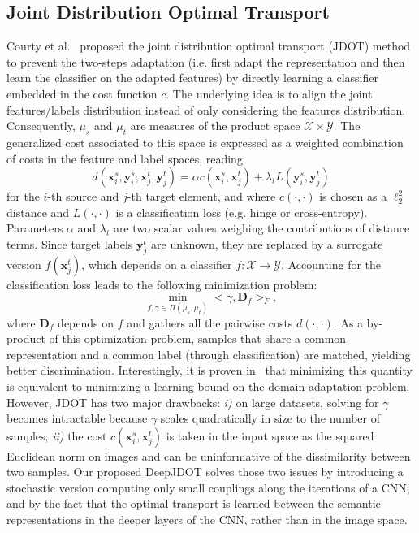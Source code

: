 \documentclass[runningheads]{llncs}
\begin{document}
\subsection{Joint Distribution Optimal Transport}
Courty et al.~\cite{courty2017joint} proposed the joint distribution optimal transport (JDOT) method to prevent the two-steps adaptation (i.e. first adapt the representation and then learn the classifier on the adapted features) by directly learning a classifier embedded in the cost function $c$. The underlying idea is to align the joint features/labels distribution instead of only considering the features distribution. Consequently, $\mu_s$ and $\mu_t$ are measures of the product space $\mathcal{X}\times\mathcal{Y}$. The generalized cost associated to this space is expressed as a weighted combination of costs in the feature and label spaces, reading
 \begin{equation}
d \left( \mathbf{x}_i^s, \mathbf{y}_i^s;\mathbf{x}_j^t, \mathbf{y}_j^t \right) = \alpha c(\mathbf{x}_i^s,\mathbf{x}_j^t) + \lambda_t L(\mathbf{y}_i^s,\mathbf{y}_j^t)
 \label{eq:cost}
 \end{equation}
 for the $i$-th source and $j$-th target element, and where $c(\cdot,\cdot)$ is chosen as a $\ell^2_2$ distance and $L(\cdot,\cdot)$ is a classification loss (e.g. hinge or cross-entropy). Parameters $\alpha$ and $ \lambda_t$ are two scalar values weighing the contributions of distance terms. Since target labels $\mathbf{y}_j^t$ are unknown, they are replaced by a surrogate version $f(\mathbf{x}_j^t)$, which depends on a classifier $f:\mathcal{X}\rightarrow\mathcal{Y}$. Accounting for the classification loss leads to the following minimization problem:
 \begin{equation}
 \min_{f,\gamma \in \Pi(\mu_s,\mu_t)}  <\gamma, \mathbf{D}_f>_F,
\end{equation}
 where  $\mathbf{D}_f$ depends on $f$ and gathers all the pairwise costs $d(\cdot,\cdot)$. As a by-product of this optimization problem, samples that share a common representation and a common label (through classification) are matched, yielding better discrimination. Interestingly, it is proven in~\cite{courty2017joint} that minimizing this quantity is equivalent to minimizing a learning bound on the domain adaptation problem. However, JDOT has two major drawbacks: {\em i)} on large datasets, solving for $\gamma$ becomes intractable because $\gamma$ scales quadratically in size to the number of samples; {\em ii)} the cost $c(\mathbf{x}_i^s,\mathbf{x}_j^t)$ is taken in the input space as the squared Euclidean norm on images and can be uninformative of the dissimilarity between two samples. Our proposed DeepJDOT solves those two issues by introducing a stochastic version computing only small couplings along the iterations of a CNN, and by the fact that the optimal transport is learned between the semantic representations in the deeper layers of the CNN, rather than in the image space. 
\end{document}
